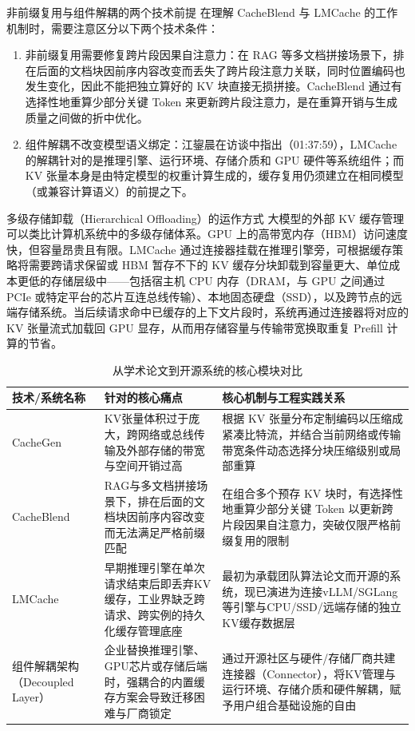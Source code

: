 \documentclass[UTF8,a4paper,11pt,fontset=fandol]{ctexart}
\begin{document}
\begin{warningbox}{非前缀复用与组件解耦的两个技术前提}
在理解 CacheBlend 与 LMCache 的工作机制时，需要注意区分以下两个技术条件：
\begin{enumerate}
\item 非前缀复用需要修复跨片段因果自注意力：在 RAG 等多文档拼接场景下，排在后面的文档块因前序内容改变而丢失了跨片段注意力关联，同时位置编码也发生变化，因此不能把独立算好的 KV 块直接无损拼接。CacheBlend 通过有选择性地重算少部分关键 Token 来更新跨片段注意力，是在重算开销与生成质量之间做的折中优化。
\item 组件解耦不改变模型语义绑定：江鋆晨在访谈中指出（01:37:59），LMCache 的解耦针对的是推理引擎、运行环境、存储介质和 GPU 硬件等系统组件；而 KV 张量本身是由特定模型的权重计算生成的，缓存复用仍须建立在相同模型（或兼容计算语义）的前提之下。
\end{enumerate}
\end{warningbox}
\begin{knowledgebox}{多级存储卸载（Hierarchical Offloading）的运作方式}
大模型的外部 KV 缓存管理可以类比计算机系统中的多级存储体系。GPU 上的高带宽内存（HBM）访问速度快，但容量昂贵且有限。LMCache 通过连接器挂载在推理引擎旁，可根据缓存策略将需要跨请求保留或 HBM 暂存不下的 KV 缓存分块卸载到容量更大、单位成本更低的存储层级中——包括宿主机 CPU 内存（DRAM，与 GPU 之间通过 PCIe 或特定平台的芯片互连总线传输）、本地固态硬盘（SSD），以及跨节点的远端存储系统。当后续请求命中已缓存的上下文片段时，系统再通过连接器将对应的 KV 张量流式加载回 GPU 显存，从而用存储容量与传输带宽换取重复 Prefill 计算的节省。
\end{knowledgebox}
\begin{table}[H]\centering\small
\caption{从学术论文到开源系统的核心模块对比}
\begin{tabular}{>{\raggedright\arraybackslash}p{\dimexpr(\linewidth-6\tabcolsep)/3\relax}>{\raggedright\arraybackslash}p{\dimexpr(\linewidth-6\tabcolsep)/3\relax}>{\raggedright\arraybackslash}p{\dimexpr(\linewidth-6\tabcolsep)/3\relax}}
\toprule
技术/系统名称 & 针对的核心痛点 & 核心机制与工程实践关系\\\midrule
CacheGen & KV张量体积过于庞大，跨网络或总线传输及外部存储的带宽与空间开销过高 & 根据 KV 张量分布定制编码以压缩成紧凑比特流，并结合当前网络或传输带宽条件动态选择分块压缩级别或局部重算\\[4pt]
CacheBlend & RAG与多文档拼接场景下，排在后面的文档块因前序内容改变而无法满足严格前缀匹配 & 在组合多个预存 KV 块时，有选择性地重算少部分关键 Token 以更新跨片段因果自注意力，突破仅限严格前缀复用的限制\\[4pt]
LMCache & 早期推理引擎在单次请求结束后即丢弃KV缓存，工业界缺乏跨请求、跨实例的持久化缓存管理底座 & 最初为承载团队算法论文而开源的系统，现已演进为连接vLLM/SGLang等引擎与CPU/SSD/远端存储的独立KV缓存数据层\\[4pt]
组件解耦架构（Decoupled Layer） & 企业替换推理引擎、GPU芯片或存储后端时，强耦合的内置缓存方案会导致迁移困难与厂商锁定 & 通过开源社区与硬件/存储厂商共建连接器（Connector），将KV管理与运行环境、存储介质和硬件解耦，赋予用户组合基础设施的自由\\[4pt]
\bottomrule\end{tabular}\end{table}
\end{document}
